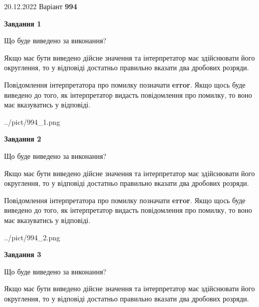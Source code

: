 \documentclass[12pt, ukrainian]{article}
\begin{document}
{20.12.2022 Варіант \No \textbf { 994 }\par}
{
\begin {Large}

{\begin {center}\textbf{Завдання 1}\end {center}}\par
Що буде виведено за виконання? \par

Якщо має бути виведено дійсне значення та інтерпретатор має здійснювати його округлення, 
то у відповіді достатньо правильно вказати два дробових розряди.

Повідомлення інтерпретатора про помилку позначати \textbf{error}.
Якщо щось буде виведено до того, як інтерпретатор видасть повідомлення про помилку, 
то воно має вказуватись у відповіді. \par

\begin{center}
	{../pict/994_1.png}
\end{center}
\newpage

{\begin {center}\textbf{Завдання 2}\end {center}}\par
Що буде виведено за виконання? \par

Якщо має бути виведено дійсне значення та інтерпретатор має здійснювати його округлення, 
то у відповіді достатньо правильно вказати два дробових розряди.

Повідомлення інтерпретатора про помилку позначати \textbf{error}.
Якщо щось буде виведено до того, як інтерпретатор видасть повідомлення про помилку, 
то воно має вказуватись у відповіді. \par

\begin{center}
	{../pict/994_2.png}
\end{center}
\newpage

{\begin {center}\textbf{Завдання 3}\end {center}}\par
Що буде виведено за виконання? \par

Якщо має бути виведено дійсне значення та інтерпретатор має здійснювати його округлення, 
то у відповіді достатньо правильно вказати два дробових розряди.


\end{Large}}
\end{document}

